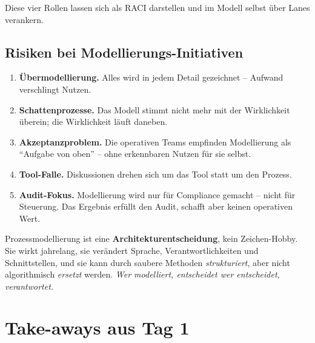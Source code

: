 \documentclass[11pt,a4paper,oneside]{article}
\begin{document}
Diese vier Rollen lassen sich als RACI darstellen und im Modell selbst über Lanes verankern.

\subsection{Risiken bei Modellierungs-Initiativen}

\begin{enumerate}
  \item \textbf{Übermodellierung.} Alles wird in jedem Detail gezeichnet -- Aufwand verschlingt Nutzen.
  \item \textbf{Schattenprozesse.} Das Modell stimmt nicht mehr mit der Wirklichkeit überein; die Wirklichkeit läuft daneben.
  \item \textbf{Akzeptanzproblem.} Die operativen Teams empfinden Modellierung als ``Aufgabe von oben'' -- ohne erkennbaren Nutzen für sie selbst.
  \item \textbf{Tool-Falle.} Diskussionen drehen sich um das Tool statt um den Prozess.
  \item \textbf{Audit-Fokus.} Modellierung wird nur für Compliance gemacht -- nicht für Steuerung. Das Ergebnis erfüllt den Audit, schafft aber keinen operativen Wert.
\end{enumerate}

\begin{merkbox}
Prozessmodellierung ist eine \textbf{Architekturentscheidung}, kein Zeichen-Hobby. Sie wirkt jahrelang, sie verändert Sprache, Verantwortlichkeiten und Schnittstellen, und sie kann durch saubere Methoden \emph{strukturiert}, aber nicht algorithmisch \emph{ersetzt} werden. \emph{Wer modelliert, entscheidet \textemdash{} wer entscheidet, verantwortet.}
\end{merkbox}

\section{Take-aways aus Tag 1}
\end{document}
